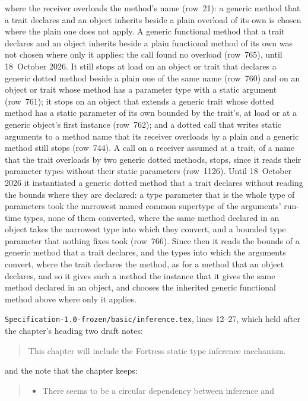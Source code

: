 \begin{description}
where the receiver overloads the method's name (row~21): a generic method that a
trait declares and an object inherits beside a plain overload of its own is
chosen where the plain one does not apply.
A generic functional method that a trait declares and an object inherits beside
a plain functional method of its own was not chosen where only it applies: the
call found no overload (row~765), until 18~October 2026.
It still stops at load on an object or trait that declares a generic dotted
method beside a plain one of the same name (row~760) and on an object or
trait whose method has a parameter type with a  static argument
(row~761); it stops on an object that extends a generic trait whose dotted
method has a static parameter of its own bounded by the trait's, at load or at a
generic object's first instance (row~762); and a dotted call that writes
static arguments to a method name that its receiver overloads by a plain and a
generic method still stops (row~744).
A call on a receiver
assumed at a trait, of a name that the trait overloads by two generic dotted
methods, stops, since it reads their parameter types without their static
parameters (row~1126).
Until 18~October 2026 it instantiated a generic dotted method that a trait
declares without reading the bounds where they are declared: a type parameter
that is the whole type of parameters took the narrowest named common supertype
of the arguments' run-time types, none of them converted, where the same method
declared in an object takes the narrowest type into which they convert, and a
bounded type parameter that nothing fixes took  (row~766).
Since then it reads the bounds of a generic method that a trait declares, and
the types into which the arguments convert, where the trait declares the
method, as for a method that an object declares, and so it gives such a method
the instance that it gives the same method declared in an object, and chooses
the inherited generic functional method above where only it applies.
\item[Original text] \nolinkurl{Specification-1.0-frozen/basic/inference.tex},
lines 12--27, which held after the chapter's heading two draft notes:
\begin{quote}
This chapter will include the Fortress static type inference mechanism.
\end{quote}
and the note that the chapter keeps:
\begin{quote}
\begin{itemize}
\item There seems to be a circular dependency between inference and

\end{itemize}
\end{quote}
\end{description}
